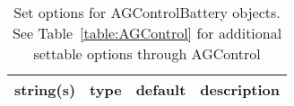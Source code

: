 \begin{table}[ht]
\centering
\begin{tabular}{p{5cm} c c p{7cm}}
\hline
string(s) & type & default & description \\
\hline
\hline
\end{tabular}
\caption{Set options for AGControlBattery objects. See Table~\ref{table:AGControl} for additional settable options through AGControl}
\label{table:AGControlBattery}
\end{table}

